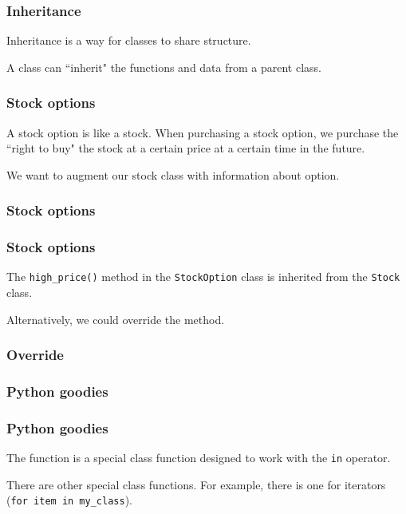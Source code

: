 \documentclass{beamer}
\begin{document}
\begin{frame}
\frametitle{Inheritance}
Inheritance is a way for classes to share structure.

\vspace{0.2in}
A class can ``inherit" the functions and data from a parent class.
\end{frame}

\begin{frame}
\frametitle{Stock options}
A stock option is like a stock.  When purchasing a stock option, we purchase the ``right to buy" the stock at a certain price at a certain time in the future.

\vspace{0.2in}
We want to augment our stock class with information about option.
\end{frame}

\begin{frame}
\frametitle{Stock options}
\end{frame}

\begin{frame}
\frametitle{Stock options}
The \texttt{high\_price()} method in the \texttt{StockOption} class is inherited from the \texttt{Stock} class.

\vspace{0.2in}
Alternatively, we could override the method.
\end{frame}

\begin{frame}
\frametitle{Override}
\end{frame}

\begin{frame}
\frametitle{Python goodies}
\end{frame}

\begin{frame}
\frametitle{Python goodies}
The  function is a special class function designed to work with the \texttt{in} operator.

\vspace{0.2in}

There are other special class functions.  For example, there is one for iterators (\texttt{for item in my\_class}).

\end{frame}






\end{document}
